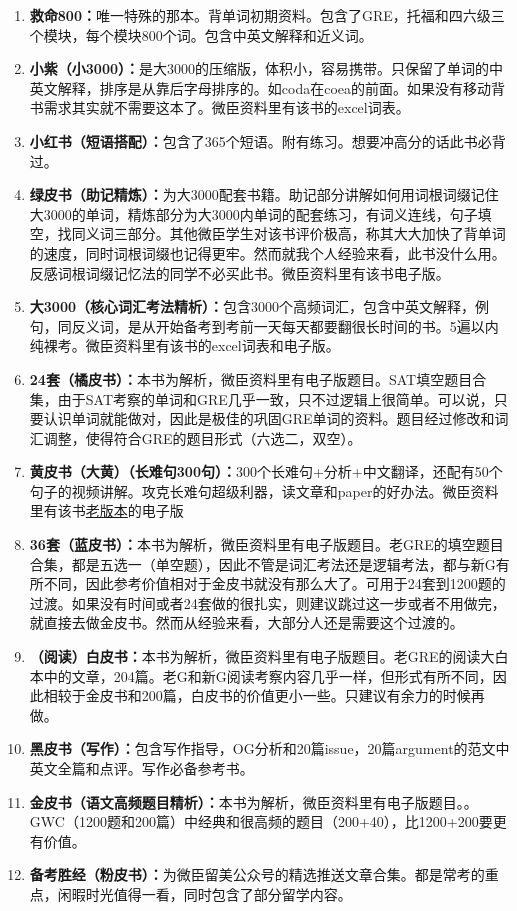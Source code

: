 \documentclass[cn,plain]{./src/qyxfbook}
\newcommand{\red}[1]{\textcolor[rgb]{1,0,0}{#1}}
\newcommand{\bluea}[1]{\textcolor[rgb]{0,0.69,0.941}{#1}}
\begin{document}
			
			\begin{enumerate}
				\item \textbf{救命800：}唯一特殊的那本。背单词初期资料。包含了GRE，托福和四六级三个模块，每个模块800个词。包含中英文解释和近义词。    
				\item \textbf{小紫（小3000）：}是大3000的压缩版，体积小，容易携带。只保留了单词的中英文解释，排序是从靠后字母排序的。如coda在coea的前面。如果没有移动背书需求其实就不需要这本了。\red{微臣资料里有该书的excel词表。}   
				\item \textbf{小红书（短语搭配）：}包含了365个短语。附有练习。想要冲高分的话此书必背过。    
				\item \textbf{绿皮书（助记精炼）：}为大3000配套书籍。助记部分讲解如何用词根词缀记住大3000的单词，精炼部分为大3000内单词的配套练习，有词义连线，句子填空，找同义词三部分。其他微臣学生对该书评价极高，称其大大加快了背单词的速度，同时词根词缀也记得更牢。然而就我个人经验来看，此书没什么用。反感词根词缀记忆法的同学不必买此书。\red{微臣资料里有该书电子版。}    
				\item \textbf{大3000（核心词汇考法精析）：}包含3000个高频词汇，包含中英文解释，例句，同反义词，是从开始备考到考前一天每天都要翻很长时间的书。5遍以内纯裸考。\red{微臣资料里有该书的excel词表和电子版}。
				\item \textbf{24套（橘皮书）：}\bluea{本书为解析，微臣资料里有电子版题目。}SAT填空题目合集，由于SAT考察的单词和GRE几乎一致，只不过逻辑上很简单。可以说，只要认识单词就能做对，因此是极佳的巩固GRE单词的资料。题目经过修改和词汇调整，使得符合GRE的题目形式（六选二，双空）。    
				\item \textbf{黄皮书（大黄）（长难句300句）：}300个长难句+分析+中文翻译，还配有50个句子的视频讲解。攻克长难句超级利器，读文章和paper的好办法。\red{微臣资料里有该书\underline{老版本}的电子版}
				\item \textbf{36套（蓝皮书）：}\bluea{本书为解析，微臣资料里有电子版题目。}老GRE的填空题目合集，都是五选一（单空题），因此不管是词汇考法还是逻辑考法，都与新G有所不同，因此参考价值相对于金皮书就没有那么大了。可用于24套到1200题的过渡。如果没有时间或者24套做的很扎实，则建议跳过这一步或者不用做完，就直接去做金皮书。然而从经验来看，大部分人还是需要这个过渡的。    
				\item \textbf{（阅读）白皮书：}本书为解析，微臣资料里有电子版题目。老GRE的阅读大白本中的文章，204篇。老G和新G阅读考察内容几乎一样，但形式有所不同，因此相较于金皮书和200篇，白皮书的价值更小一些。只建议有余力的时候再做。    
				\item \textbf{黑皮书（写作）：}包含写作指导，OG分析和20篇issue，20篇argument的范文中英文全篇和点评。写作必备参考书。    
				\item \textbf{金皮书（语文高频题目精析）：}\bluea{本书为解析，微臣资料里有电子版题目。}。GWC（1200题和200篇）中经典和很高频的题目（200+40），比1200+200要更有价值。    
				\item \textbf{备考胜经（粉皮书）：}为微臣留美公众号的精选推送文章合集。都是常考的重点，闲暇时光值得一看，同时包含了部分留学内容。
			\end{enumerate}
			
\end{document}
